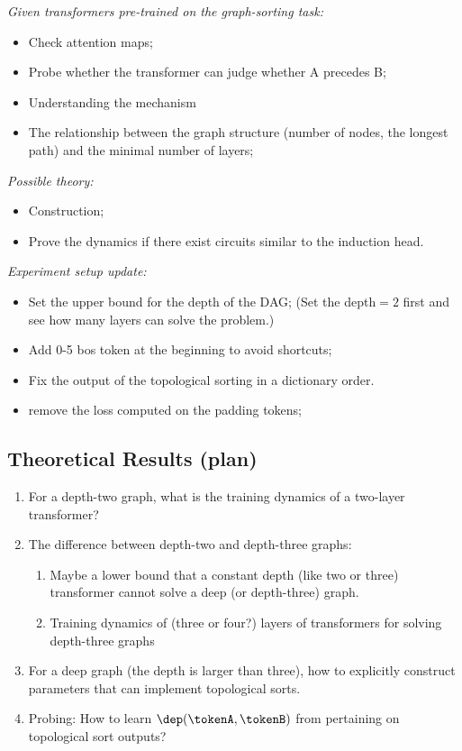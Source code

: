 \emph{Given transformers pre-trained on the graph-sorting task:} 
\begin{itemize}
    \item Check attention maps;
    \item Probe whether the transformer can judge whether A precedes B;
    \item Understanding the mechanism
    \item The relationship between the graph structure (number of nodes, the longest path) and the minimal number of layers;
\end{itemize}

\emph{Possible theory:}
\begin{itemize}
    \item Construction;
    \item Prove the dynamics if there exist circuits similar to the induction head.
\end{itemize}

\emph{Experiment setup update:}
\begin{itemize}
    \item Set the upper bound for the depth of the DAG; (Set the depth$=2$ first and see how many layers can solve the problem.)
    \item Add 0-5 bos token at the beginning to avoid shortcuts;
    \item Fix the output of the topological sorting in a dictionary order.
    \item remove the loss computed on the padding tokens;
\end{itemize}

\subsection{Theoretical Results (plan)}

\begin{enumerate}
    \item For a depth-two graph, what is the training dynamics of a two-layer transformer?
    \item The difference between depth-two and depth-three graphs:
    \begin{enumerate}
        \item Maybe a lower bound that a constant depth (like two or three) transformer cannot solve a deep (or depth-three) graph.
        \item Training dynamics of (three or four?) layers of transformers for solving depth-three graphs
    \end{enumerate}
    \item For a deep graph (the depth is larger than three), how to explicitly construct parameters that can implement topological sorts. 
    \item Probing: How to learn $\dep(\tokenA,\tokenB)$ from pertaining on topological sort outputs?
\end{enumerate}


